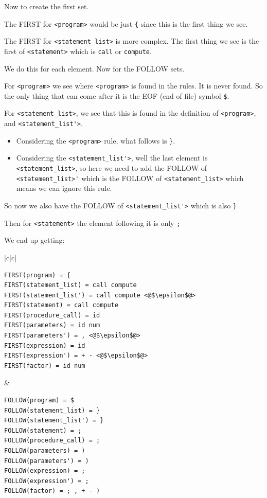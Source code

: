 \documentclass[12pt,letterpaper]{article} \usepackage{amsmath} \usepackage{graphicx} \usepackage[margin=1in]{geometry} \usepackage{longtable}  \usepackage{amssymb}
\begin{document}
\begin{mdframed}
		Now to create the first set. 
		
		The FIRST for \verb*|<program>| would be just \verb*|{| since this is the first thing we see.
			
		The FIRST for \verb*|<statement_list>| is more complex. The first thing we see is the first of \verb*|<statement>| which is \verb*|call| or \verb*|compute|.
		
		We do this for each element. Now for the FOLLOW sets. 
		
		For \verb*|<program>| we see where \verb*|<program>| is found in the rules. It is never found. So the only thing that can come after it is the EOF (end of file) symbol \verb*|$|.
		
		For \verb*|<statement_list>|, we see that this is found in the definition of \verb*|<program>|, and \verb*|<statement_list'>|. 
		\begin{itemize}
			\item Considering the \verb*|<program>| rule, what follows is \verb*|}|. 
			\item Considering the \verb*|<statement_list'>|, well the last element is \verb*|<statement_list>|, so here we need to add the FOLLOW of \verb*|<statement_list>'| which is the FOLLOW of \verb*|<statement_list>| which means we can ignore this rule. 
		\end{itemize}
	
		So now we also have the FOLLOW of \verb*|<statement_list'>| which is also \verb|}|
	
		Then for \verb*|<statement>| the element following it is only \verb*|;|
		
		We end up getting:
		\begin{center}
			\begin{tabular}{|c|c|}
				\hline
				\begin{lstlisting}
FIRST(program) = {
FIRST(statement_list) = call compute
FIRST(statement_list') = call compute <@$\epsilon$@>
FIRST(statement) = call compute
FIRST(procedure_call) = id
FIRST(parameters) = id num
FIRST(parameters') = , <@$\epsilon$@>
FIRST(expression) = id
FIRST(expression') = + - <@$\epsilon$@>
FIRST(factor) = id num
				\end{lstlisting}&  
			\begin{lstlisting}
FOLLOW(program) = $
FOLLOW(statement_list) = }
FOLLOW(statement_list') = }
FOLLOW(statement) = ;
FOLLOW(procedure_call) = ;
FOLLOW(parameters) = )
FOLLOW(parameters') = )
FOLLOW(expression) = ;
FOLLOW(expression') = ;
FOLLOW(factor) = ; , + - )
			\end{lstlisting}\\
				\hline
			\end{tabular}
		\end{center}
	
	\end{mdframed}
	
\end{document}
